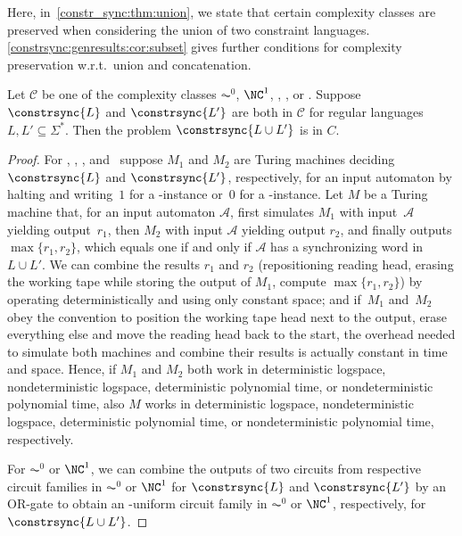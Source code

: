 
Here, in~\cref{constr_sync:thm:union}, we state that certain complexity classes
are preserved when considering the union
of two constraint languages. \cref{constrsync:genresults:cor:subset}
gives further conditions
for complexity preservation w.r.t.~union
and concatenation.

\begin{theorem}
	\label{constr_sync:thm:union}
	Let $\mathcal C$ be one of the complexity classes $\AC^0$, $\NC^1$, \LOGSPACE, \NL, \PTIME or \NP.
	Suppose $\constrsync{L}$ and $\constrsync{L'}$ are both in $\mathcal C$ for regular languages $L,L' \subseteq \Sigma^*$.
	Then  the problem $\constrsync{L \cup L'}$ is in $C$.
\end{theorem}
\begin{proof}
For \LOGSPACE, \NL, \PTIME, and \NP\ suppose
$M_1$ and $M_2$ are Turing machines deciding $\constrsync{L}$
and $\constrsync{L'}$, respectively, for an input automaton
by halting and writing~$1$ for a \rYES-instance
or~$0$ for a \rNO-instance.
Let $M$ be a Turing machine that, for an input automaton $\mathcal A$,
first simulates $M_1$ with input~$\mathcal A$ yielding output~$r_1$,
then $M_2$ with input $\mathcal A$ yielding output $r_2$, and finally outputs $\max\{r_1, r_2\}$,
which equals one if and only if $\mathcal A$ has a synchronizing word in $L \cup L'$.  
We can combine the results $r_1$ and $r_2$  (repositioning reading head, erasing the working tape while storing the output of $M_1$, compute
$\max\{r_1, r_2\}$) 
by operating deterministically and using only constant space;
and if~$M_1$ and~$M_2$ obey the convention to
position the working tape head next to the output, erase
everything else and  move the reading head back to the start,
the overhead
needed to simulate both machines and combine  their results is actually constant in time and space.
Hence, if $M_1$ and $M_2$ both work in deterministic logspace, nondeterministic logspace,
deterministic polynomial time, or nondeterministic polynomial time,
also $M$ works in deterministic logspace, nondeterministic logspace,
deterministic polynomial time, or nondeterministic polynomial time, respectively.

For $\AC^0$ or $\NC^1$, we can combine the outputs
of two circuits from respective circuit families in $\AC^0$ or $\NC^1$ for $\constrsync{L}$
and $\constrsync{L'}$ by an OR-gate
to obtain an \LOGSPACE-uniform circuit family in $\AC^0$ or $\NC^1$, respectively, 
for $\constrsync{L \cup L'}$.
\end{proof}


